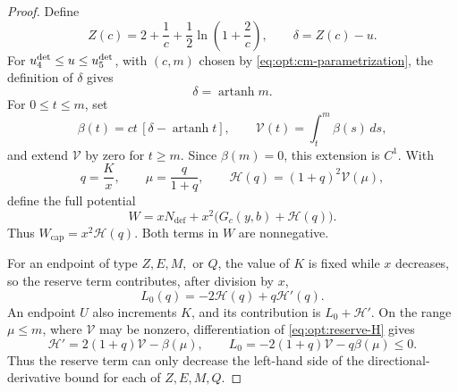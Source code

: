 \begin{proof}
Define
\begin{equation}
 Z(c)=2+\frac1c+\frac12\ln\!\left(1+\frac2c\right),
 \qquad
 \delta=Z(c)-u.
 \label{eq:opt:Z-delta}
\end{equation}
For $u_{4}^{\mathrm{det}}\le u\le u_{5}^{\mathrm{det}}$, with $(c,m)$ chosen by
\cref{eq:opt:cm-parametrization}, the definition of $\delta$ gives
\begin{equation}
 \delta=\operatorname{artanh}m.
 \label{eq:opt:delta-atanh}
\end{equation}
For $0\le t\le m$, set
\begin{equation}
 \beta(t)=ct\,[\delta-\operatorname{artanh}t],
 \qquad
 \mathcal V(t)=\int_t^m\beta(s)\,ds,
 \label{eq:opt:reserve-integral}
\end{equation}
and extend $\mathcal V$ by zero for $t\ge m$.  Since
$\beta(m)=0$, this extension is $C^1$.  With
\begin{equation}
 q=\frac Kx,
 \qquad
 \mu=\frac{q}{1+q},
 \qquad
 \mathcal H(q)=(1+q)^2\mathcal V(\mu),
 \label{eq:opt:reserve-H}
\end{equation}
define the full potential
\begin{equation}
 W=xN_{\mathrm{def}}+x^2\bigl(G_c(y,b)+\mathcal H(q)\bigr).
 \label{eq:opt:full-potential}
\end{equation}
Thus $W_{\mathrm{cap}}=x^2\mathcal H(q)$.  Both terms in $W$ are
nonnegative.

For an endpoint of type $Z,E,M,$ or $Q$, the value of $K$ is fixed while
$x$ decreases, so the reserve term contributes, after division by
$x$,
\begin{equation}
 L_0(q)=-2\mathcal H(q)+q\mathcal H'(q).
 \label{eq:opt:L0}
\end{equation}
An endpoint $U$ also increments $K$, and its contribution is
$L_0+\mathcal H'$.  On the range $\mu\le m$, where $\mathcal V$ may be
nonzero, differentiation of
\eqref{eq:opt:reserve-H} gives
\begin{equation}
 \mathcal H'=2(1+q)\mathcal V-\beta(\mu),
 \qquad
 L_0=-2(1+q)\mathcal V-q\beta(\mu)\le0.
 \label{eq:opt:reserve-derivatives}
\end{equation}
Thus the reserve term can only decrease the left-hand side of the
directional-derivative bound for each of $Z,E,M,Q$.


\end{proof}
